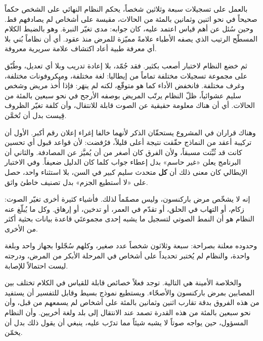 \documentclass[11pt,a4paper]{report}
\newcommand{\shead}[1]{\par\vspace{7pt}\noindent{\large\textbf{#1}}\par\vspace{2pt}}
\begin{document}
\begin{Arabic}
\shead{5. ما الذي وُجد}
بالعمل على تسجيلات سبعة وثلاثين شخصاً، يحكم النظام النهائي على الشخص
حكماً صحيحاً في نحو اثنين وثمانين بالمئة من الحالات، مقيسة على أشخاص
لم يصادفهم قط. وحين سُئل عن أهم قياس اعتمد عليه، كان جوابه: مدى تغيّر
النبرة. وهو بالضبط الكلام المسطّح الرتيب الذي يصفه الأطباء علامةً
مميّزة للمرض منذ عقود. أي أن نظاماً بُني بلا أي معرفة طبية أعاد
اكتشاف علامة سريرية معروفة.

ثم خضع النظام لاختبار أصعب بكثير. فقد جُمّد، بلا إعادة تدريب وبلا أي
تعديل، وطُبّق على مجموعة تسجيلات مختلفة تماماً من إيطاليا: لغة
مختلفة، وميكروفونات مختلفة، وغرف مختلفة. فانخفض الأداء كما هو
متوقّع، لكنه لم ينهَر: فإذا أُخذ مريض وشخص سليم عشوائياً، ظلّ النظام
يرتّب المريض بوصفه الأرجح في نحو سبعين بالمئة من الحالات. أي أن هناك
معلومة حقيقية عن الصوت قابلة للانتقال، وأن كلفة تغيّر الظروف قِيست
بدل أن تُخمَّن.

وهناك قراران في المشروع يستحقّان الذكر لأنهما خالفا إغراء إعلان رقم
أكبر. الأول أن تركيبة أعقد من النماذج حقّقت نتيجة أعلى قليلاً،
فرُفضت: لأن قواعد قبول أي تحسين كانت قد ثُبِّتت مسبقاً، ولأن الفرق
كان أصغر من أن يُميَّز عن المصادفة. والثاني أن البرنامج يعلن «غير
حاسم» بدل إعطاء جواب كلما كان الدليل ضعيفاً. وفي الاختبار الإيطالي
كان معنى ذلك أن \textbf{كل} متحدث سليم كبير في السن، بلا استثناء
واحد، حصل على «لا أستطيع الجزم» بدل تصنيف خاطئ واثق.

\shead{6. ما ليس هذا النظام}
إنه لا يشخّص مرض باركنسون، وليس مصمّماً لذلك. فأشياء كثيرة أخرى
تغيّر الصوت: زكام، أو التهاب في الحلق، أو تقدّم في العمر، أو تدخين،
أو إرهاق. وكل ما يُبلّغ عنه النظام هو أن النمط الصوتي لتسجيل ما يشبه
إحدى مجموعتَي قاعدة بيانات بحثية أكثر من الأخرى.

وحدوده معلنة بصراحة: سبعة وثلاثون شخصاً عدد صغير، وكلهم سُجّلوا بجهاز
واحد وبلغة واحدة، والنظام لم يُختبر تحديداً على أشخاص في المرحلة
الأبكر من المرض، ودرجته ليست احتمالاً للإصابة.

والخلاصة الأمينة هي التالية. توجد فعلاً خصائص قابلة للقياس في الكلام
تختلف بين المصابين بمرض باركنسون والأصحّاء. ويستطيع نموذج بسيط وقابل
للتفسير أن يستفيد من هذه الفروق بدقة تقارب اثنين وثمانين بالمئة على
أشخاص لم يسمعهم من قبل، وأن نحو سبعين بالمئة من هذه القدرة تصمد عند
الانتقال إلى بلد ولغة أخريين. وأن النظام المسؤول، حين يواجه صوتاً لا
يشبه شيئاً مما تدرّب عليه، ينبغي أن يقول ذلك بدل أن يخمّن.

\end{Arabic}
\end{document}
